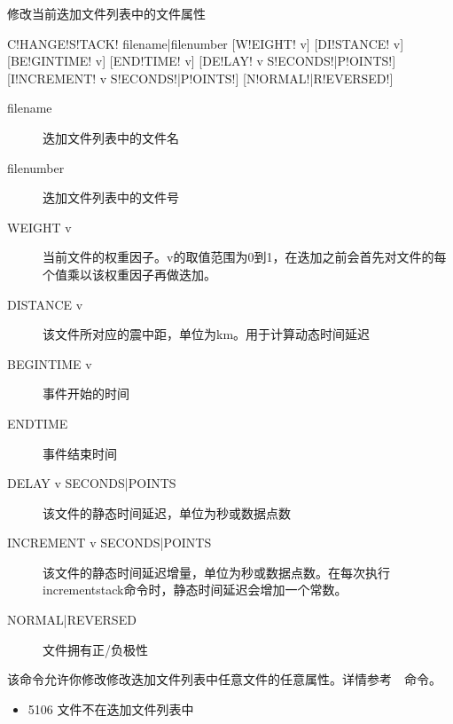 \label{sss:changestack}

修改当前迭加文件列表中的文件属性

\begin{SACSTX}
C!HANGE!S!TACK! filename|filenumber [W!EIGHT! v] [DI!STANCE! v]
    [BE!GINTIME! v] [END!TIME! v] [DE!LAY! v S!ECONDS!|P!OINTS!]
    [I!NCREMENT! v S!ECONDS!|P!OINTS!] [N!ORMAL!|R!EVERSED!]
\end{SACSTX}

\begin{description}
\item [filename] 迭加文件列表中的文件名
\item [filenumber] 迭加文件列表中的文件号
\item [WEIGHT v] 当前文件的权重因子。v的取值范围为0到1，在迭加之前会首先对文件的每个值乘以该权重因子再做迭加。
\item [DISTANCE v] 该文件所对应的震中距，单位为km。用于计算动态时间延迟
\item [BEGINTIME v] 事件开始的时间
\item [ENDTIME] 事件结束时间
\item [DELAY v SECONDS|POINTS] 该文件的静态时间延迟，单位为秒或数据点数
\item [INCREMENT v SECONDS|POINTS] 该文件的静态时间延迟增量，单位为秒或数据点数。在每次执行incrementstack命令时，静态时间延迟会增加一个常数。
\item [NORMAL|REVERSED] 文件拥有正/负极性
\end{description}

\SACTitle{}
该命令允许你修改修改迭加文件列表中任意文件的任意属性。详情参考~~命令。

\begin{itemize}
\item 5106 文件不在迭加文件列表中
\end{itemize}


